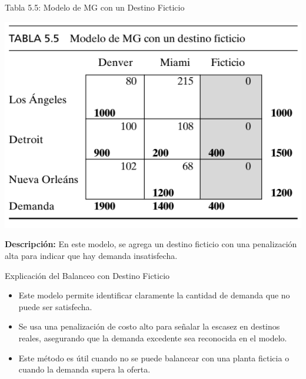 \documentclass{beamer}
\begin{document}
\begin{frame}{Tabla 5.5: Modelo de MG con un Destino Ficticio}
\begin{center}
    \includegraphics[scale=1]{images/transporte02.png}
\end{center}
    \vspace{0.3cm}
    \textbf{Descripción:} En este modelo, se agrega un destino ficticio con una penalización alta para indicar que hay demanda insatisfecha.
\end{frame}

\begin{frame}{Explicación del Balanceo con Destino Ficticio}
    \begin{itemize}
        \item Este modelo permite identificar claramente la cantidad de demanda que no puede ser satisfecha.
        \item Se usa una penalización de costo alto para señalar la escasez en destinos reales, asegurando que la demanda excedente sea reconocida en el modelo.
        \item Este método es útil cuando no se puede balancear con una planta ficticia o cuando la demanda supera la oferta.
    \end{itemize}
\end{frame}
\end{document}
